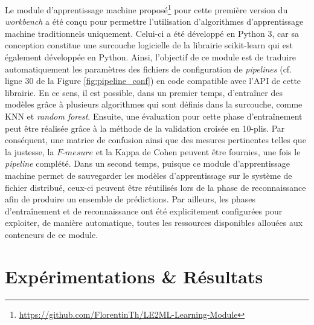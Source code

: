 Le module d'apprentissage machine proposé\footnote{\url{https://github.com/FlorentinTh/LE2ML-Learning-Module}} pour cette première version du \textit{workbench} a été conçu pour permettre l'utilisation d'algorithmes d'apprentissage machine traditionnels uniquement. Celui-ci a été développé en Python 3, car sa conception constitue une surcouche logicielle de la librairie scikit-learn qui est également développée en Python. Ainsi, l'objectif de ce module est de traduire automatiquement les paramètres des fichiers de configuration de \textit{pipelines} (cf. ligne 30 de la Figure \ref{fig:pipeline_conf}) en code compatible avec l'\acs{API} de cette librairie. En ce sens, il est possible, dans un premier temps, d'entraîner des modèles grâce à plusieurs algorithmes qui sont définis dans la surcouche, comme \acl{KNN} et \textit{random forest}. Ensuite, une évaluation pour cette phase d'entraînement peut être réalisée grâce à la méthode de la validation croisée en 10-plis. Par conséquent, une matrice de confusion ainsi que des mesures pertinentes telles que la justesse, la $F\mbox{-} mesure$ et la Kappa de Cohen peuvent être fournies, une fois le \textit{pipeline} complété. Dans un second temps, puisque ce module d'apprentissage machine permet de sauvegarder les modèles d'apprentissage sur le système de fichier distribué, ceux-ci peuvent être réutilisés lors de la phase de reconnaissance afin de produire un ensemble de prédictions. Par ailleurs, les phases d'entraînement et de reconnaissance ont été explicitement configurées pour exploiter, de manière automatique, toutes les ressources disponibles allouées aux conteneurs de ce module.



\section{Expérimentations \& Résultats}


